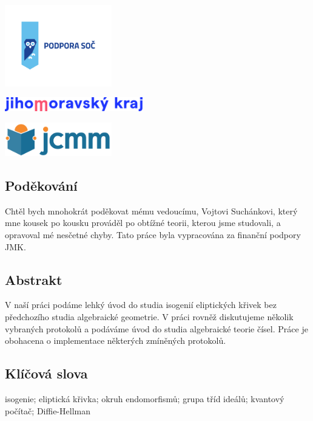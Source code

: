 \documentclass[12pt]{report}
\begin{document}
\newpage
\thispagestyle{empty}
\begin{center}
\includegraphics[width=0.35\textwidth]{podpora_soc-horizontalni.png}
\end{center}
\vspace*{1.5cm}
\begin{center}
\includegraphics[width=0.45\textwidth]{logo_JMK_pruhledne.png}
\end{center}
\vspace*{2.2cm}
\begin{center}
\includegraphics[width=0.35\textwidth]{jcmm-logotype-positive1.png}
\end{center}
\vspace*{6.5cm}
\subsection*{Poděkování}
Chtěl bych mnohokrát poděkovat mému vedoucímu, Vojtovi Suchánkovi, který mne kousek po kousku prováděl po obtížné teorii, kterou jsme studovali, a opravoval mé nesčetné chyby. Tato práce byla vypracována za finanční podpory JMK.


\newpage
\thispagestyle{empty}
\subsection*{Abstrakt}
V naší práci podáme lehký úvod do studia isogenií eliptických křivek bez předchozího studia algebraické geometrie. V práci rovněž diskutujeme několik vybraných protokolů a podáváme úvod do studia algebraické teorie čísel. Práce je obohacena o implementace některých zmíněných protokolů.


\subsection*{Klíčová slova}
isogenie; eliptická křivka; okruh endomorfismů; grupa tříd ideálů; kvantový počítač; Diffie-Hellman
\end{document}
